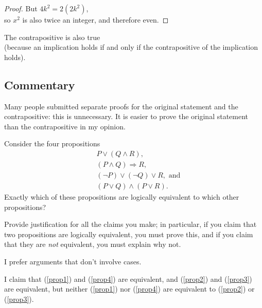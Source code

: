\documentclass[12pt]{midterm}
\begin{document}
\begin{exam}
\begin{solution}
\begin{solutiontext}
\begin{proof}
      \vspace{1ex}\noindent%
      But $4k^2 = 2(2k^2)$, \\
      so $x^2$ is also twice an integer, and therefore even.
    \end{proof}

    \vspace{1ex}\noindent%
    The contrapositive is also true \\
    (because an implication holds if and only if the contrapositive of the implication holds).

\color{magenta!50!black}
\vfill
\setlength{\leftskip}{0in}
\subsection*{Commentary}

Many people submitted separate proofs for the original statement and
the contrapositive: this is unnecessary.  It is easier to prove the
original statement than the contrapositive in my opinion.

\end{solutiontext}\end{solution}

\begin{problem}[360]
  Consider the four propositions
  \begin{eqnarray}
    & & P \vee (Q \wedge R), \label{prop1} \\
    & & (P \wedge Q) \Rightarrow R, \label{prop2} \\
    & & (\neg P) \vee (\neg Q) \vee R, \mbox{ and } \label{prop3} \\
    & & (P \vee Q) \wedge (P \vee R). \label{prop4}
  \end{eqnarray}
  Exactly which of these propositions are logically equivalent to
  which other propositions?
  \vspace{1ex}

  \noindent Provide justification for all the claims
  you make; in particular, if you claim that two propositions are
  logically equivalent, you must prove this, and if you claim that
  they are \textit{not} equivalent, you must explain why not.
  \vspace{1ex}

  \noindent I prefer arguments that don't involve cases.
\end{problem}

\begin{solution}\begin{solutiontext}
I claim that (\ref{prop1}) and (\ref{prop4}) are equivalent, and (\ref{prop2}) and (\ref{prop3}) are equivalent, but 
neither (\ref{prop1}) nor (\ref{prop4}) are equivalent to (\ref{prop2}) or (\ref{prop3}).


\end{solutiontext}
\end{solution}
\end{exam}
\end{document}
